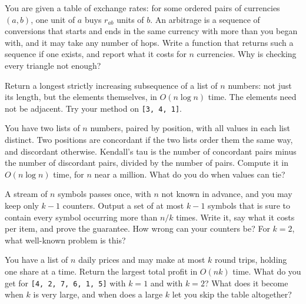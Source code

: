 \begin{question}\label{iq:iv3:algorithms:50}
You are given a table of exchange rates: for some ordered pairs of currencies $(a, b)$, one unit of $a$ buys $r_{ab}$ units of $b$. An arbitrage is a sequence of conversions that starts and ends in the same currency with more than you began with, and it may take any number of hops. Write a function that returns such a sequence if one exists, and report what it costs for $n$ currencies. Why is checking every triangle not enough?
\end{question}

\begin{question}\label{iq:iv3:algorithms:51}
Return a longest strictly increasing subsequence of a list of $n$ numbers: not just its length, but the elements themselves, in $O(n \log n)$ time. The elements need not be adjacent. Try your method on \texttt{[3, 4, 1]}.
\end{question}

\begin{question}\label{iq:iv3:algorithms:52}
You have two lists of $n$ numbers, paired by position, with all values in each list distinct. Two positions are concordant if the two lists order them the same way, and discordant otherwise. Kendall's tau is the number of concordant pairs minus the number of discordant pairs, divided by the number of pairs. Compute it in $O(n \log n)$ time, for $n$ near a million. What do you do when values can tie?
\end{question}

\begin{question}\label{iq:iv3:algorithms:53}
A stream of $n$ symbols passes once, with $n$ not known in advance, and you may keep only $k - 1$ counters. Output a set of at most $k - 1$ symbols that is sure to contain every symbol occurring more than $n / k$ times. Write it, say what it costs per item, and prove the guarantee. How wrong can your counters be? For $k = 2$, what well-known problem is this?
\end{question}

\begin{question}\label{iq:iv3:algorithms:54}
You have a list of $n$ daily prices and may make at most $k$ round trips, holding one share at a time. Return the largest total profit in $O(nk)$ time. What do you get for \texttt{[4, 2, 7, 6, 1, 5]} with $k = 1$ and with $k = 2$? What does it become when $k$ is very large, and when does a large $k$ let you skip the table altogether?
\end{question}

